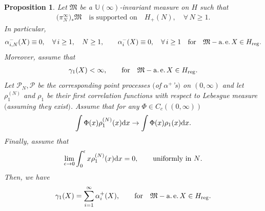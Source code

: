\documentclass[pdftex]{sigma}
\numberwithin{equation}{section}
\newtheorem{Proposition}[Theorem]{Proposition}
{ \theoremstyle{definition}
\newtheorem{Definition}[Theorem]{Definition}
\newtheorem{Remark}[Theorem]{Remark} }
\begin{document}
\begin{Proposition}\label{AbstractGamma1}
Let $\mathfrak{M}$ be a $\mathbb{U}(\infty)$-invariant measure on $H$ such that
\begin{gather*}
\big(\pi_N^{\infty}\big)_*\mathfrak{M} \quad \text{is supported on} \quad H_+(N),\quad \forall\, N \ge 1.
\end{gather*}
In particular,
\begin{gather*}
\alpha_{i,N}^-(X)\equiv 0, \quad \forall\, i\ge 1, \quad N\ge 1, \qquad \alpha_i^-(X)\equiv 0, \quad \forall\, i \ge 1 \quad \text{for} \quad \mathfrak{M}-\operatorname{a.e.} X \in H_{{\rm reg}}.
\end{gather*}
Moreover, assume that
\begin{gather*}
\gamma_1(X)<\infty, \qquad \text{for} \quad \mathfrak{M}-\operatorname{a.e.} X \in H_{{\rm reg}}.
\end{gather*}
Let $\mathcal{P}_N, \mathcal{P}$ be the corresponding point processes $($of $\alpha^+$'s$)$ on $(0,\infty)$ and let $\rho_1^{(N)}$ and $\rho_1$ be their first correlation functions with respect to Lebesgue measure $($assuming they exist$)$. Assume that for any $\Phi \in C_c ((0,\infty) )$
\begin{gather*}
\int \Phi(x)\rho_1^{(N)}(x){\rm d}x\to \int \Phi(x)\rho_1(x){\rm d}x.
\end{gather*}
Finally, assume that
\begin{gather*}
\lim_{\epsilon \to 0} \int_{0}^{\epsilon}x \rho_1^{(N)}(x){\rm d}x=0, \qquad \text{uniformly in $N$}.
\end{gather*}
Then, we have
\begin{gather*}
\gamma_1(X)=\sum_{i=1}^{\infty}\alpha_i^+(X), \qquad \text{for} \quad \mathfrak{M}-\operatorname{a.e.} X \in H_{{\rm reg}}.
\end{gather*}
\end{Proposition}
\end{document}
